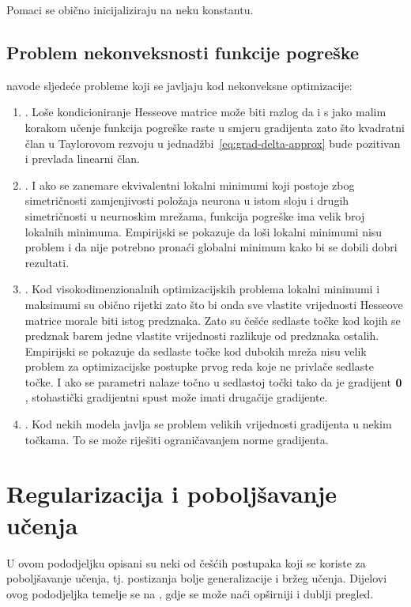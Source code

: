 \documentclass[utf8, diplomski, lmodern]{fer}
\begin{document}
Pomaci se obično inicijaliziraju na neku konstantu.

\subsection{Problem nekonveksnosti funkcije pogreške}

\citet{Goodfellow:2016:DL} navode sljedeće probleme koji se javljaju kod nekonveksne optimizacije:
\begin{enumerate}[topsep=0pt,itemsep=0pt,partopsep=0pt]
	\item {}. Loše kondicioniranje Hesseove matrice može biti razlog da i s jako malim korakom učenje funkcija pogreške raste u smjeru gradijenta zato što kvadratni član u Taylorovom rezvoju u jednadžbi~\eqref{eq:grad-delta-approx}  bude pozitivan i prevlada linearni član.
	\item {}. I ako se zanemare ekvivalentni lokalni minimumi koji postoje zbog simetričnosti zamjenjivosti položaja neurona u istom sloju i drugih simetričnosti u neurnoskim mrežama, funkcija pogreške ima velik broj lokalnih minimuma. Empirijski se pokazuje da loši lokalni minimumi nisu problem i da nije potrebno pronaći globalni minimum kako bi se dobili dobri rezultati.
	\item {}. Kod visokodimenzionalnih optimizacijskih problema lokalni minimumi i maksimumi su obično rijetki zato što bi onda sve vlastite vrijednosti Hesseove matrice morale biti istog predznaka. Zato su češće sedlaste točke kod kojih se predznak barem jedne vlastite vrijednosti razlikuje od predznaka ostalih. Empirijski se pokazuje da sedlaste točke kod dubokih mreža nisu velik problem za optimizacijske postupke prvog reda koje ne privlače sedlaste točke. I ako se parametri nalaze točno u sedlastoj točki tako da je gradijent $\mathbf{0}$, stohastički gradijentni spust može imati drugačije gradijente.
	\item {}. Kod nekih modela javlja se problem velikih vrijednosti gradijenta u nekim točkama. To se može riješiti ograničavanjem norme gradijenta.
\end{enumerate}


\section{Regularizacija i poboljšavanje učenja}

U ovom pododjeljku opisani su neki od češćih postupaka koji se koriste za poboljšavanje učenja, tj. postizanja bolje generalizacije i bržeg učenja. Dijelovi ovog pododjeljka temelje se na \citet{Goodfellow:2016:DL}, gdje se može naći opširniji i dublji pregled.
\end{document}
